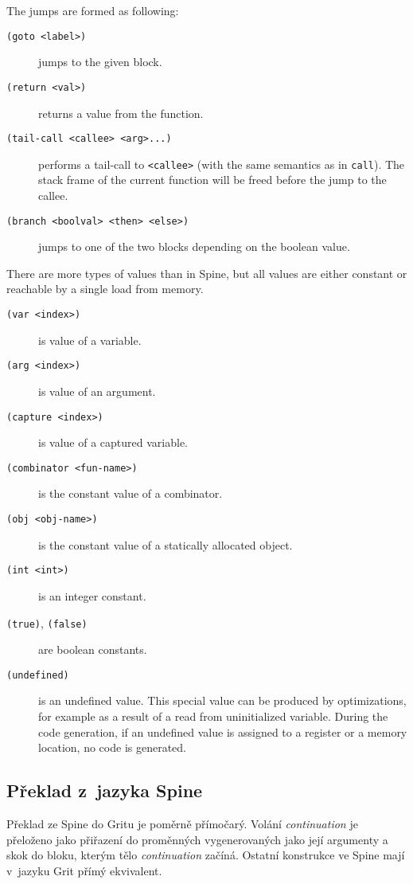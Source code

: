 The jumps are formed as following:

\begin{description}
  \item[\texttt{(goto <label>)}] jumps to the given block.
  \item[\texttt{(return <val>)}] returns a value from the function.
  \item[\texttt{(tail-call <callee> <arg>...)}] performs a tail-call to
    \texttt{<callee>} (with the same semantics as in \texttt{call}). The stack
    frame of the current function will be freed before the jump to the callee.
  \item[\texttt{(branch <boolval> <then> <else>)}] jumps to one of the two
    blocks depending on the boolean value.
\end{description}

There are more types of values than in Spine, but all values are either constant
or reachable by a single load from memory.

\begin{description}
  \item[\texttt{(var <index>)}] is value of a variable.
  \item[\texttt{(arg <index>)}] is value of an argument.
  \item[\texttt{(capture <index>)}] is value of a captured variable.
  \item[\texttt{(combinator <fun-name>)}] is the constant value of a combinator.
  \item[\texttt{(obj <obj-name>)}] is the constant value of a statically
    allocated object.
  \item[\texttt{(int <int>)}] is an integer constant.
  \item[\texttt{(true)}, \texttt{(false)}] are boolean constants.
  \item[\texttt{(undefined)}] is an undefined value. This special value can be
    produced by optimizations, for example as a result of a read from
    uninitialized variable. During the code generation, if an undefined value is
    assigned to a register or a memory location, no code is generated.
\end{description}

\subsection{Překlad z~jazyka Spine}

Překlad ze Spine do Gritu je poměrně přímočarý. Volání \emph{continuation} je
přeloženo jako přiřazení do proměnných vygenerovaných jako její argumenty a skok
do bloku, kterým tělo \emph{continuation} začíná. Ostatní konstrukce ve Spine
mají v~jazyku Grit přímý ekvivalent.

